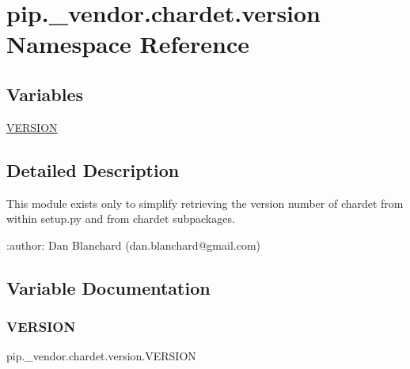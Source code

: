 \hypertarget{namespacepip_1_1__vendor_1_1chardet_1_1version}{}\section{pip.\+\_\+vendor.\+chardet.\+version Namespace Reference}
\label{namespacepip_1_1__vendor_1_1chardet_1_1version}
\subsection*{Variables}
\begin{DoxyCompactItemize}
\item 
\hyperlink{namespacepip_1_1__vendor_1_1chardet_1_1version_a2ade5c538baeb6973a3faa8fd8165c10}{V\+E\+R\+S\+I\+ON}
\end{DoxyCompactItemize}


\subsection{Detailed Description}
\begin{DoxyVerb}This module exists only to simplify retrieving the version number of chardet
from within setup.py and from chardet subpackages.

:author: Dan Blanchard (dan.blanchard@gmail.com)
\end{DoxyVerb}
 

\subsection{Variable Documentation}
\mbox{\label{namespacepip_1_1__vendor_1_1chardet_1_1version_a2ade5c538baeb6973a3faa8fd8165c10}} 
\subsubsection{\texorpdfstring{V\+E\+R\+S\+I\+ON}{VERSION}}
{\footnotesize\ttfamily pip.\+\_\+vendor.\+chardet.\+version.\+V\+E\+R\+S\+I\+ON}

